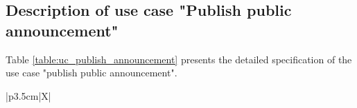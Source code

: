 \documentclass[../Main.tex]{subfiles}
\begin{document}
\subsection{Description of use case "Publish public announcement"}
\label{section:2.3.4}

Table \ref{table:uc_publish_announcement} presents the detailed specification of the use case "publish public announcement".

\renewcommand{\arraystretch}{1.3}
\begin{xltabular}{\textwidth}{|p{3.5cm}|X|}
    \caption{Use case specification for "Publish public announcement"}
    \label{table:uc_publish_announcement} \\
    \hline
    \endfirsthead

     \\
    \hline
    \endhead

    \hline
     \\
    \endfoot

    \hline
    \endlastfoot


\end{xltabular}
\end{document}

